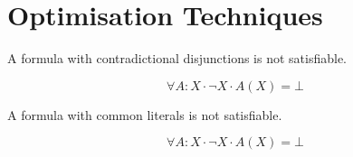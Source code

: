 \documentclass[12pt, letterpaper]{article}
\begin{document}
    \section{Optimisation Techniques}

    \begin{description} {
        \item[Contradiction.]

            A formula with contradictional disjunctions
            is not satisfiable.
            
            \[\forall A : X \cdot \lnot X \cdot A(X) = \bot \]
        }
        \item[Common Literals.] {
            A formula with common literals
            is not satisfiable.
            
            \[\forall A : X \cdot \lnot X \cdot A(X) = \bot \]
        }
    \end{description}
\end{document}
